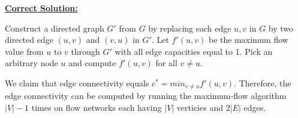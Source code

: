 \documentclass[12pt]{article}
\begin{document}
\begin{enumerate}[1.]









    \bigskip

    \begin{mdframed}
    \underline{\textbf{Correct Solution:}}

    \bigskip

    \color{red}
    Construct a directed graph $G'$ from $G$ by replacing each edge $u,v$ in $G$ by
    two directed edge $(u,v)$ and $(v,u)$ in $G'$. Let $f'(u,v)$ be the maximum flow value
    from $u$ to $v$ through $G'$ with all edge capacities equal to 1. Pick an arbitrary node $u$
    and compute $f'(u,v)$ for all $v \neq u$.

    \bigskip

    We claim that edge connectivity equals $c^{*} = min_{v \neq u} f'(u,v)$. Therefore,
    the edge connectivity can be computed by running the maximum-flow algorithm $\lvert V \rvert - 1$
    times on flow networks each having $\lvert V \lvert$ verticies and $2\lvert E \rvert$ edges.
    \color{black}


\end{mdframed}
\end{enumerate}
\end{document}
